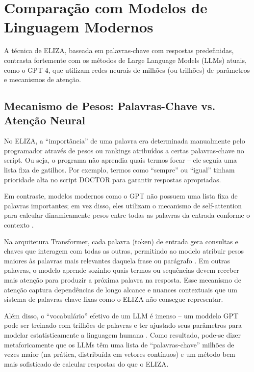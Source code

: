 \documentclass[a4paper,oneside]{book}
\begin{document}
\section{Comparação com Modelos de Linguagem Modernos}

A técnica de ELIZA, baseada em palavras-chave com respostas predefinidas, contrasta fortemente com os métodos de Large Language Models (LLMs) atuais, como o GPT-4, que utilizam redes neurais de milhões (ou trilhões) de parâmetros e mecanismos de atenção.

\subsection{Mecanismo de Pesos: Palavras-Chave vs. Atenção Neural}

No ELIZA, a “importância” de uma palavra era determinada manualmente pelo programador através de pesos ou rankings atribuídos a certas palavras-chave no script. Ou seja, o programa não aprendia quais termos focar – ele seguia uma lista fixa de gatilhos. Por exemplo, termos como “sempre” ou “igual” tinham prioridade alta no script DOCTOR para garantir respostas apropriadas.

Em contraste, modelos modernos como o GPT não possuem uma lista fixa de palavras importantes; em vez disso, eles utilizam o mecanismo de self-attention para calcular dinamicamente pesos entre todas as palavras da entrada conforme o contexto \cite{Vaswani2017}.

Na arquitetura Transformer, cada palavra (token) de entrada gera consultas e chaves que interagem com todas as outras, permitindo ao modelo atribuir pesos maiores às palavras mais relevantes daquela frase ou parágrafo \cite{Vaswani2017}. Em outras palavras, o modelo aprende sozinho quais termos ou sequências devem receber mais atenção para produzir a próxima palavra na resposta. Esse mecanismo de atenção captura dependências de longo alcance e nuances contextuais que um sistema de palavras-chave fixas como o ELIZA não consegue representar.

Além disso, o “vocabulário” efetivo de um LLM é imenso – um moddelo GPT pode ser treinado com trilhões de palavras e ter ajustado seus parâmetros para modelar estatisticamente a linguagem humana \cite{Vaswani2017}. Como resultado, pode-se dizer metaforicamente que os LLMs têm uma lista de “palavras-chave” milhões de vezes maior (na prática, distribuída em vetores contínuos) e um método bem mais sofisticado de calcular respostas do que o ELIZA.
\end{document}
